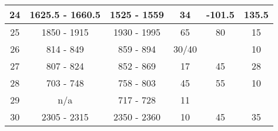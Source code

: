 \begin{table}[]
\begin{tabular}{|c|c|c|c|c|c|}
24                                                          & 1625.5 - 1660.5                                        & 1525 - 1559                                              & 34                                                                   & -101.5                                                           & 135.5                                                       \\ \hline
25                                                          & 1850 - 1915                                            & 1930 - 1995                                              & 65                                                                   & 80                                                               & 15                                                          \\ \hline
26                                                          & 814 - 849                                              & 859 - 894                                                & 30/40                                                                &                                                                  & 10                                                          \\ \hline
27                                                          & 807 - 824                                              & 852 - 869                                                & 17                                                                   & 45                                                               & 28                                                          \\ \hline
28                                                          & 703 - 748                                              & 758 - 803                                                & 45                                                                   & 55                                                               & 10                                                          \\ \hline
29                                                          & n/a                                                    & 717 - 728                                                & 11                                                                   &                                                                  &                                                             \\ \hline
30                                                          & 2305 - 2315                                            & 2350 - 2360                                              & 10                                                                   & 45                                                               & 35                                                          \\ \hline

\end{tabular}
\end{table}
